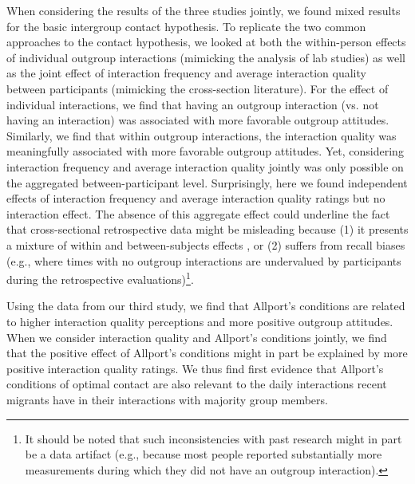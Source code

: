 \documentclass[man, 12pt, a4paper, mask]{apa7}
\theoremstyle{break}
\theoremstyle{plain}
\begin{document}
When considering the results of the three studies jointly, we found mixed results for the basic intergroup contact hypothesis. To replicate the two common approaches to the contact hypothesis, we looked at both the within-person effects of individual outgroup interactions (mimicking the analysis of lab studies) as well as the joint effect of interaction frequency and average interaction quality between participants (mimicking the cross-section literature). For the effect of individual interactions, we find that having an outgroup interaction (vs. not having an interaction) was associated with more favorable outgroup attitudes. Similarly, we find that within outgroup interactions, the interaction quality was meaningfully associated with more favorable outgroup attitudes. Yet, considering interaction frequency and average interaction quality jointly was only possible on the aggregated between-participant level. Surprisingly, here we found independent effects of interaction frequency and average interaction quality ratings but no interaction effect. The absence of this aggregate effect could underline the fact that cross-sectional retrospective data might be misleading because (1) it presents a mixture of within and between-subjects effects \citep[][]{Hamaker2020}, or (2) suffers from recall biases (e.g., where times with no outgroup interactions are undervalued by participants during the retrospective evaluations)\footnote{It should be noted that such inconsistencies with past research might in part be a data artifact (e.g., because most people reported substantially more measurements during which they did not have an outgroup interaction).}.

Using the data from our third study, we find that Allport's conditions are related to higher interaction quality perceptions and more positive outgroup attitudes. When we consider interaction quality and Allport's conditions jointly, we find that the positive effect of Allport's conditions might in part be explained by more positive interaction quality ratings. We thus find first evidence that Allport's conditions of optimal contact are also relevant to the daily interactions recent migrants have in their interactions with majority group members. 
\end{document}
